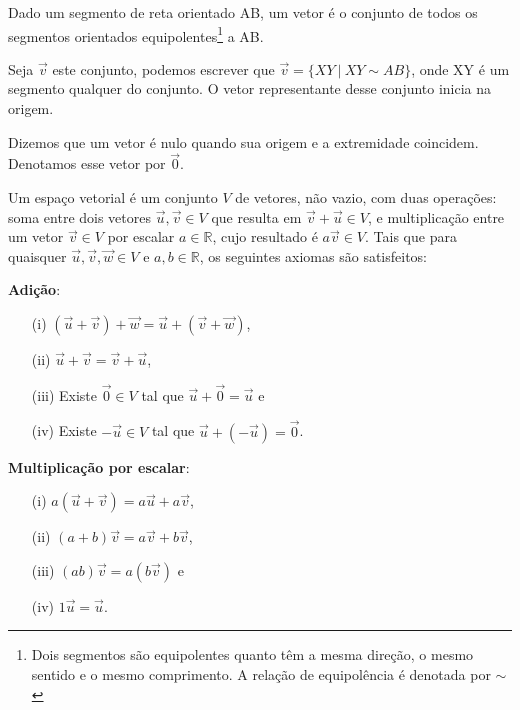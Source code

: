 \begin{definition}[vetores]
    Dado um segmento de reta orientado AB, um vetor é o conjunto de todos os segmentos orientados equipolentes\footnote{Dois segmentos são equipolentes quanto têm a mesma direção, o mesmo sentido e o mesmo comprimento. A relação de equipolência é denotada por $\sim$} a AB.
\end{definition}

Seja $\vec{v}$ este conjunto, podemos escrever que $\vec{v} = \{XY\ |\ XY \sim AB\}$, onde XY é um segmento qualquer do conjunto. O vetor representante desse conjunto inicia na origem.

\begin{definition}
    Dizemos que um vetor é nulo quando sua origem e a extremidade coincidem. Denotamos esse vetor por $\vec{0}$.
\end{definition}

\begin{definition}
    Um espaço vetorial é um conjunto $V$ de vetores, não vazio, com duas operações: soma entre dois vetores $\vec{u},\vec{v} \in V$ que resulta em $\vec{v} + \vec{u} \in V$, e multiplicação entre um vetor $\vec{v} \in V$ por escalar $a \in \mathbb{R}$, cujo resultado é $a\vec{v} \in V$. Tais que para quaisquer $\vec{u},\vec{v},\vec{w} \in V$ e $a,b \in \mathbb{R}$, os seguintes axiomas são satisfeitos:
    
    \noindent
    \textbf{Adição}:
    \begin{itemize}
        \item[(i)] $(\vec{u} + \vec{v}) + \vec{w} = \vec{u} + (\vec{v} + \vec{w})$,
        \item[(ii)] $\vec{u} + \vec{v} = \vec{v} + \vec{u}$,
        \item[(iii)] Existe $\vec{0} \in V$ tal que $\vec{u} + \vec{0} = \vec{u}$ e
        \item[(iv)] Existe $-\vec{u} \in V$ tal que $\vec{u} + (-\vec{u}) = \vec{0}$.
    \end{itemize}
    
    \noindent
    \textbf{Multiplicação por escalar}:
    \begin{itemize}
        \item[(i)] $a(\vec{u} + \vec{v}) = a\vec{u} + a\vec{v}$,
        \item[(ii)] $(a + b)\vec{v} = a\vec{v} + b\vec{v}$,
        \item[(iii)] $(ab)\vec{v} = a(b\vec{v})$ e
        \item[(iv)] $1\vec{u} = \vec{u}$.
    \end{itemize}
\end{definition}

